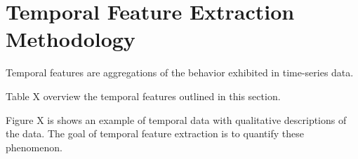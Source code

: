 \section{Temporal Feature Extraction Methodology}
\label{sec:featureextraction}

Temporal features are aggregations of the behavior exhibited in time-series data.

Table X overview the temporal features outlined in this section.

Figure X is shows an example of temporal data with qualitative descriptions of the data. The goal of temporal feature extraction is to quantify these phenomenon.

